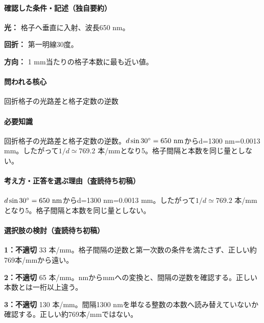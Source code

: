 \paragraph{確認した条件・記述（独自要約）}\mbox{}\par

\noindent\textbf{光：} 格子へ垂直に入射、波長650 nm。\par

\noindent\textbf{回折：} 第一明線30度。\par

\noindent\textbf{方向：} 1 mm当たりの格子本数に最も近い値。\par

\paragraph{問われる核心} 回折格子の光路差と格子定数の逆数

\paragraph{必要知識} 回折格子の光路差と格子定数の逆数。\(d\sin30^\circ=650\ {\rm nm}\)からd=\allowbreak{}1300 nm=\allowbreak{}0.0013 mm。したがって\(1/d\simeq769.2\) 本/mmとなり5。格子間隔と本数を同じ量としない。

\paragraph{考え方・正答を選ぶ理由（査読待ち初稿）} \(d\sin30^\circ=650\ {\rm nm}\)からd=\allowbreak{}1300 nm=\allowbreak{}0.0013 mm。したがって\(1/d\simeq769.2\) 本/mmとなり5。格子間隔と本数を同じ量としない。

\paragraph{選択肢の検討（査読待ち初稿）}\mbox{}\par

\noindent\textbf{1：不適切} 33 本/mm。格子間隔の逆数と第一次数の条件を満たさず、正しい約769本/mmから遠い。\par

\noindent\textbf{2：不適切} 65 本/mm。nmからmmへの変換と、間隔の逆数を確認する。正しい本数とは一桁以上違う。\par

\noindent\textbf{3：不適切} 130 本/mm。間隔1300 nmを単なる整数の本数へ読み替えていないか確認する。正しい約769本/mmではない。\par

